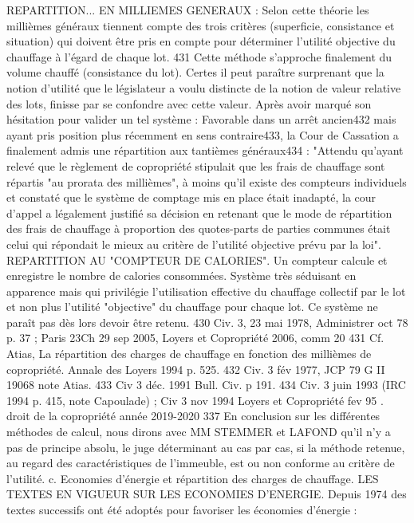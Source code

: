 		REPARTITION... EN MILLIEMES GENERAUX :
		Selon cette théorie les millièmes généraux tiennent compte des trois critères (superficie, consistance et situation) qui doivent être pris en compte pour déterminer l'utilité objective du chauffage à l'égard de chaque lot. 431
		Cette méthode s'approche finalement du volume chauffé (consistance du lot). Certes il peut paraître surprenant que la notion d'utilité que le législateur a voulu distincte de la notion de valeur relative des lots, finisse par se confondre avec cette valeur.
		Après avoir marqué son hésitation pour valider un tel système : Favorable dans un arrêt ancien432 mais ayant pris position plus récemment en sens contraire433, la Cour de Cassation a finalement admis une répartition aux tantièmes généraux434 :
		"Attendu qu'ayant relevé que le règlement de copropriété stipulait que les frais de chauffage sont répartis "au prorata des millièmes", à moins qu'il existe des compteurs individuels et constaté que le système de comptage mis en place était inadapté, la cour d'appel a légalement justifié sa décision en retenant que le mode de répartition des frais de chauffage à proportion des quotes-parts de parties communes était celui qui répondait le mieux au critère de l'utilité objective prévu par la loi".
		REPARTITION AU "COMPTEUR DE CALORIES".
		Un compteur calcule et enregistre le nombre de calories consommées. Système très séduisant en apparence mais qui privilégie l'utilisation effective du chauffage collectif par le lot et non plus l'utilité "objective" du chauffage pour chaque lot. Ce système ne paraît pas dès lors devoir être retenu.
		430 Civ. 3\degres, 23 mai 1978, Administrer oct 78 p. 37 ; Paris 23\degres Ch 29 sep 2005, Loyers et Copropriété 2006, comm 20
		431 Cf. Atias, La répartition des charges de chauffage en fonction des millièmes de copropriété. Annale des Loyers 1994 p. 525.
		432 Civ. 3 fév 1977, JCP 79 G II 19068 note Atias.
		433 Civ 3 déc. 1991 Bull. Civ.  p 191.
		434 Civ. 3 juin 1993 (IRC 1994  p. 415, note Capoulade) ; Civ 3 nov 1994 Loyers et Copropriété fev 95 .
		droit de la copropriété année 2019-2020
		337
		En conclusion sur les différentes méthodes de calcul, nous dirons avec MM STEMMER et LAFOND qu’il n’y a pas de principe absolu, le juge déterminant au cas par cas, si la méthode retenue, au regard des caractéristiques de l’immeuble, est ou non conforme au critère de l’utilité.
		c. Economies d’énergie et répartition des charges de chauffage.
		LES TEXTES EN VIGUEUR SUR LES ECONOMIES D'ENERGIE.
		Depuis 1974 des textes successifs ont été adoptés pour favoriser les économies d'énergie :
